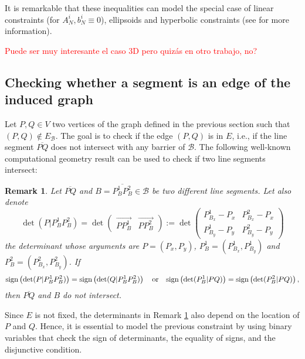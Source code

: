 \documentclass[a4paper]{elsarticle}
\newtheorem{remark}{Remark}
\begin{document}
	It is remarkable that these inequalities can model the special case of linear constraints (for $A_N^{i}, b_N^i\equiv 0$), ellipsoids and hyperbolic constraints (see \cite{Lobo1998} for more information).
	
	\textcolor{red}{Puede ser muy interesante el caso 3D pero quizás en otro trabajo, no?}
	
	\subsection{Checking whether a segment is an edge of the induced graph}
	
	Let $P, Q\in V$ two vertices of the graph defined in the previous section such that $(P, Q)\not\in E_\mathcal B$. The goal is to check if the edge $(P, Q)$ is in $E$, i.e., if the line segment $\overline{PQ}$ does not intersect with any barrier of $\mathcal B$. The following well-known computational geometry result can be used to check if two line segments intersect:
	
	\newcommand{\segment}[2]{\overline{#1#2}}
	\newcommand{\determinant}[3]{\det({#1|#2#3})}
	
	
	\begin{remark}\label{rem:determinants}
		Let $\overline{PQ}$ and $B=\overline{P_B^1P_B^2}\in\mathcal B$ be two different line segments. Let also denote 
		$$
		\determinant{P}{P_B^1}{P_B^2}=\det\left(\begin{array}{c|c} \overrightarrow{PP_B^1} & \overrightarrow{PP_B^2}\end{array}\right):=\det\left( \begin{array}{cc}  P_{B_x}^1-P_x & P_{B_x}^2-P_x \\ P_{B_y}^1-P_y & P_{B_y}^2-P_y \end{array}\right)$$ 
		the determinant whose arguments are $P=(P_x,P_y)$, $P_B^1=(P_{B_x}^1,P_{B_y}^1)$ and $P_B^2=(P_{B_x}^2,P_{B_y}^2)$. If
		\begin{equation*}
			\normalfont{\text{sign}}\left(\determinant{P}{P_B^1}{P_B^2}\right) = \normalfont{\text{sign}}\left(\determinant{Q}{P_B^1}{P_B^2}\right)
			\quad
			\text{or}
			\quad
			\normalfont{\text{sign}}\left(\determinant{P_B^1}{P}{Q}\right) = \normalfont{\text{sign}}\left(\determinant{P_B^2}{P}{Q}\right)
			,
		\end{equation*}
		then $\overline{PQ}$ and $B$ do not intersect.
	\end{remark}
	
	Since $E$ is not fixed, the determinants in Remark \ref{rem:determinants} also depend on the location of $P$ and $Q$.  Hence, it is essential to model the previous constraint by using binary variables that check the sign of determinants, the equality of signs, and the disjunctive condition.
	
\end{document}

